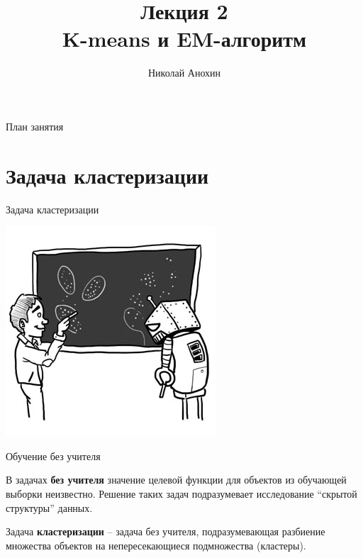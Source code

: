 \documentclass[aspectratio=169]{beamer}
\author{Николай Анохин}
\title{\newline \newline \newline Лекция 2 \\ K-means и EM-алгоритм}
\let\otp\titlepage
\renewcommand{\titlepage}{\otp\addtocounter{framenumber}{-1}}
\begin{document}

\begin{frame}[plain]
\titlepage
\end{frame}

\begin{frame}{План занятия}
\tableofcontents
\end{frame}

\section{Задача кластеризации}

\begin{frame}{}

\begin{center}
{\LARGE Задача кластеризации}

\vspace{2em}
\includegraphics[scale=0.5]{images/clustering_joke.jpg}
\end{center}

\end{frame}

\begin{frame}{Обучение без учителя}

В задачах {\bf без учителя} значение целевой функции для объектов из обучающей выборки неизвестно. Решение таких задач подразумевает исследование ``скрытой структуры'' данных.

\vspace{2em}
Задача {\bf кластеризации} -- задача без учителя, подразумевающая разбиение множества объектов на непересекающиеся подмножества (кластеры).

\end{frame}
\end{document}
